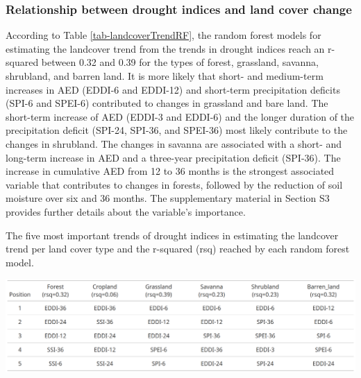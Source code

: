 \documentclass[
  authoryear,
  preprint,
  3p,
  onecolumn]{elsarticle}
\begin{document}
\hypertarget{relationship-between-drought-indices-and-land-cover-change}{%
\subsubsection{Relationship between drought indices and land cover
change}\label{relationship-between-drought-indices-and-land-cover-change}}

According to Table \ref{tab-landcoverTrendRF}, the random forest models
for estimating the landcover trend from the trends in drought indices
reach an r-squared between 0.32 and 0.39 for the types of forest,
grassland, savanna, shrubland, and barren land. It is more likely that
short- and medium-term increases in AED (EDDI-6 and EDDI-12) and
short-term precipitation deficits (SPI-6 and SPEI-6) contributed to
changes in grassland and bare land. The short-term increase of AED
(EDDI-3 and EDDI-6) and the longer duration of the precipitation deficit
(SPI-24, SPI-36, and SPEI-36) most likely contribute to the changes in
shrubland. The changes in savanna are associated with a short- and
long-term increase in AED and a three-year precipitation deficit
(SPI-36). The increase in cumulative AED from 12 to 36 months is the
strongest associated variable that contributes to changes in forests,
followed by the reduction of soil moisture over six and 36 months. The
supplementary material in Section S3 provides further details about the
variable's importance.

\begin{table}[!ht]
\caption{The five most important trends of drought indices in estimating the landcover trend per land cover type and the r-squared (rsq) reached by each random forest model.}
\label{tab-landcoverTrendRF}
\includegraphics[]{../output/figs/table_importance_trends_landcover_vs_drought.png}
\end{table}
\end{document}
